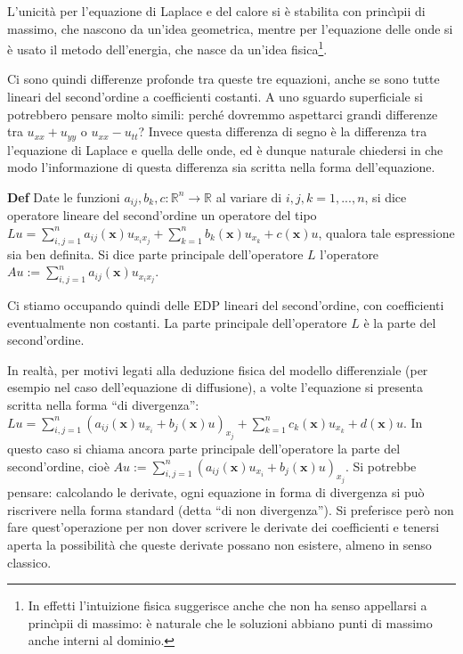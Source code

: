 \documentclass{article}
\begin{document}
L'unicit\`{a} per l'equazione di Laplace e del calore si \`{e} stabilita con
princ\`{\i}pii di massimo, che nascono da un'idea geometrica, mentre per
l'equazione delle onde si \`{e} usato il metodo dell'energia, che nasce da
un'idea fisica\footnote{%
In effetti l'intuizione fisica suggerisce anche che non ha senso appellarsi
a princ\`{\i}pii di massimo: \`{e} naturale che le soluzioni abbiano punti
di massimo anche interni al dominio.}.

Ci sono quindi differenze profonde tra queste tre equazioni, anche se sono
tutte lineari del second'ordine a coefficienti costanti. A uno sguardo
superficiale si potrebbero pensare molto simili: perch\'{e} dovremmo
aspettarci grandi differenze tra $u_{xx}+u_{yy}$ o $u_{xx}-u_{tt}$? Invece
questa differenza di segno \`{e} la differenza tra l'equazione di Laplace e
quella delle onde, ed \`{e} dunque naturale chiedersi in che modo
l'informazione di questa differenza sia scritta nella forma dell'equazione.

\textbf{Def} Date le funzioni $a_{ij},b_{k},c:%
\mathbb{R}
^{n}\rightarrow 
\mathbb{R}
$ al variare di $i,j,k=1,...,n$, si dice operatore lineare del second'ordine
un operatore del tipo $Lu=\sum_{i,j=1}^{n}a_{ij}\left( \mathbf{x}\right)
u_{x_{i}x_{j}}+\sum_{k=1}^{n}b_{k}\left( \mathbf{x}\right) u_{x_{k}}+c\left( 
\mathbf{x}\right) u$, qualora tale espressione sia ben definita. Si dice
parte principale dell'operatore $L$ l'operatore $Au:=\sum_{i,j=1}^{n}a_{ij}%
\left( \mathbf{x}\right) u_{x_{i}x_{j}}$.

Ci stiamo occupando quindi delle EDP lineari del second'ordine, con
coefficienti eventualmente non costanti. La parte principale dell'operatore $%
L$ \`{e} la parte del second'ordine.

In realt\`{a}, per motivi legati alla deduzione fisica del modello
differenziale (per esempio nel caso dell'equazione di diffusione), a volte
l'equazione si presenta scritta nella forma \textquotedblleft di
divergenza\textquotedblright : $Lu=\sum_{i,j=1}^{n}\left( a_{ij}\left( 
\mathbf{x}\right) u_{x_{i}}+b_{j}\left( \mathbf{x}\right) u\right)
_{x_{j}}+\sum_{k=1}^{n}c_{k}\left( \mathbf{x}\right) u_{x_{k}}+d\left( 
\mathbf{x}\right) u$. In questo caso si chiama ancora parte principale
dell'operatore la parte del second'ordine, cio\`{e} $Au:=\sum_{i,j=1}^{n}%
\left( a_{ij}\left( \mathbf{x}\right) u_{x_{i}}+b_{j}\left( \mathbf{x}%
\right) u\right) _{x_{j}}$. Si potrebbe pensare: calcolando le derivate,
ogni equazione in forma di divergenza si pu\`{o} riscrivere nella forma
standard (detta \textquotedblleft di non divergenza\textquotedblright ). Si
preferisce per\`{o} non fare quest'operazione per non dover scrivere le
derivate dei coefficienti e tenersi aperta la possibilit\`{a} che queste
derivate possano non esistere, almeno in senso classico.
\end{document}
